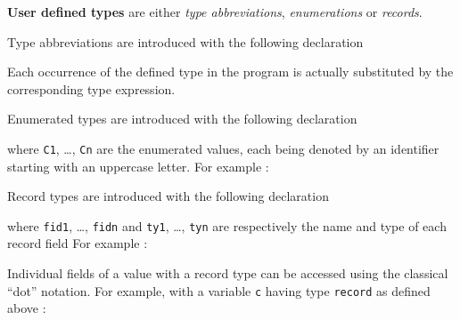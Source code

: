 \bigskip
\textbf{User defined types} are either \emph{type abbreviations}, \emph{enumerations} or
\emph{records}.

\medskip
\step Type abbreviations are introduced with the following declaration
\begin{center}
\end{center}
Each occurrence of the defined type in the program is actually substituted by the corresponding type
expression.

\medskip
\step Enumerated types  are introduced with the following declaration
\begin{center}
\end{center}
where \verb|C1|, \ldots, \verb|Cn| are the enumerated values, each being denoted by an identifier
starting with an uppercase letter. For example : 
\begin{center}
\end{center}

\medskip
\step Record types are introduced with the following declaration
\begin{center}
\end{center}
where \verb|fid1|, \ldots, \verb|fidn| and \verb|ty1|, \ldots, \verb|tyn| are respectively the name
and type of each record field For example : 
\begin{center}
\end{center}

Individual fields of a value with a record type can be accessed using the classical ``dot''
notation. For example, with a variable \verb|c| having type \verb|record| as defined above :
\begin{center}
\end{center}

